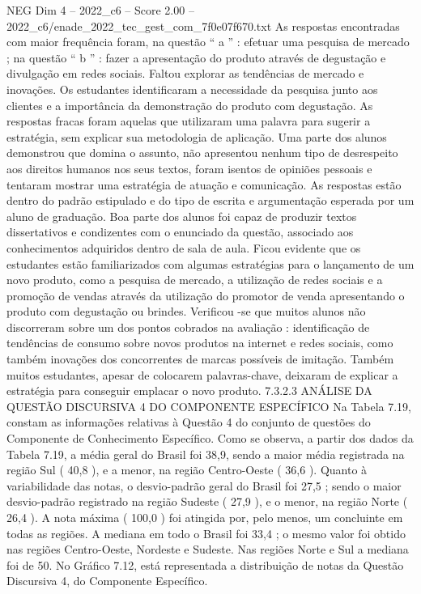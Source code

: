 \begin{textsample}{NEG Dim 4 – 2022\_c6 – Score 2.00 – 2022\_c6/enade\_2022\_tec\_gest\_com\_7f0e07f670.txt}
As respostas encontradas com maior frequência foram, na questão “ a ” : efetuar uma pesquisa de mercado ; na questão “ b ” : fazer a apresentação do produto através de degustação e divulgação em redes sociais.
Faltou explorar as tendências de mercado e inovações.
Os estudantes identificaram a necessidade da pesquisa junto aos clientes e a importância da demonstração do produto com degustação.
As respostas fracas foram aquelas que utilizaram uma palavra para sugerir a estratégia, sem explicar sua metodologia de aplicação.
Uma parte dos alunos demonstrou que domina o assunto, não apresentou nenhum tipo de desrespeito aos direitos humanos nos seus textos, foram isentos de opiniões pessoais e tentaram mostrar uma estratégia de atuação e comunicação.
As respostas estão dentro do padrão estipulado e do tipo de escrita e argumentação esperada por um aluno de graduação.
Boa parte dos alunos foi capaz de produzir textos dissertativos e condizentes com o enunciado da questão, associado aos conhecimentos adquiridos dentro de sala de aula.
Ficou evidente que os estudantes estão familiarizados com algumas estratégias para o lançamento de um novo produto, como a pesquisa de mercado, a utilização de redes sociais e a promoção de vendas através da utilização do promotor de venda apresentando o produto com degustação ou brindes.
Verificou -se que muitos alunos não discorreram sobre um dos pontos cobrados na avaliação : identificação de tendências de consumo sobre novos produtos na internet e redes sociais, como também inovações dos concorrentes de marcas possíveis de imitação.
Também muitos estudantes, apesar de colocarem palavras-chave, deixaram de explicar a estratégia para conseguir emplacar o novo produto. 7.3.2.3 ANÁLISE DA QUESTÃO DISCURSIVA 4 DO COMPONENTE ESPECÍFICO Na Tabela 7.19, constam as informações relativas à Questão 4 do conjunto de questões do Componente de Conhecimento Específico.
Como se observa, a partir dos dados da Tabela 7.19, a média geral do Brasil foi 38,9, sendo a maior média registrada na região Sul ( 40,8 ), e a menor, na região Centro-Oeste ( 36,6 ).
Quanto à variabilidade das notas, o desvio-padrão geral do Brasil foi 27,5 ; sendo o maior desvio-padrão registrado na região Sudeste ( 27,9 ), e o menor, na região Norte ( 26,4 ).
A nota máxima ( 100,0 ) foi atingida por, pelo menos, um concluinte em todas as regiões.
A mediana em todo o Brasil foi 33,4 ; o mesmo valor foi obtido nas regiões Centro-Oeste, Nordeste e Sudeste.
Nas regiões Norte e Sul a mediana foi de 50.
No Gráfico 7.12, está representada a distribuição de notas da Questão Discursiva 4, do Componente Específico.

\end{textsample}
